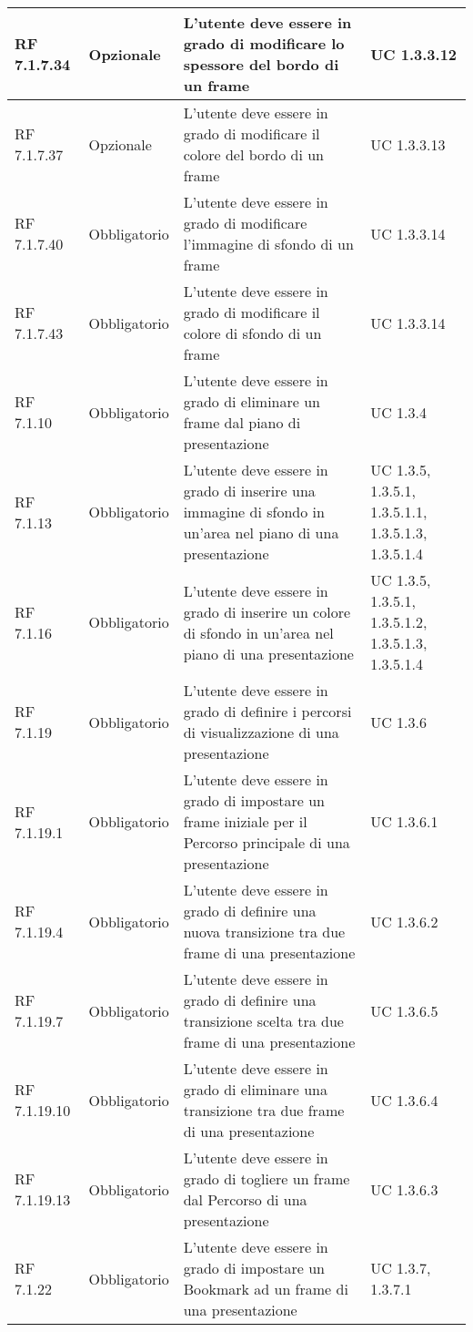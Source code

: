 {\begin{longtable} [c]{| p{2.5cm} | p{2.5cm} | p{6cm} |p{2.5cm}|}
		\hline
		RF 7.1.7.34 & Opzionale & L'utente deve essere in grado di modificare lo spessore del bordo di un frame\ped{g} & UC 1.3.3.12\\
		\hline
		RF 7.1.7.37 & Opzionale & L'utente deve essere in grado di modificare il colore del bordo di un frame\ped{g} & UC 1.3.3.13\\
		\hline
		RF 7.1.7.40 & Obbligatorio & L'utente deve essere in grado di modificare l'immagine di sfondo di un frame\ped{g} & UC 1.3.3.14\\
		\hline
		RF 7.1.7.43 & Obbligatorio & L'utente deve essere in grado di modificare il colore di sfondo di un frame\ped{g} & UC 1.3.3.14\\
		\hline
		RF 7.1.10 & Obbligatorio & L'utente deve essere in grado di eliminare un frame\ped{g} dal piano di presentazione & UC 1.3.4\\
		\hline
		RF 7.1.13 & Obbligatorio & L'utente deve essere in grado di inserire una immagine di sfondo in un’area nel piano di una presentazione & UC 1.3.5, 1.3.5.1, 1.3.5.1.1, 1.3.5.1.3, 1.3.5.1.4\\
		\hline
		RF 7.1.16 & Obbligatorio & L'utente deve essere in grado di inserire un colore di sfondo in un’area nel piano di una presentazione & UC 1.3.5, 1.3.5.1, 1.3.5.1.2, 1.3.5.1.3, 1.3.5.1.4\\
		\hline
		RF 7.1.19 & Obbligatorio & L'utente deve essere in grado di definire i percorsi\ped{g} di visualizzazione di una presentazione & UC 1.3.6\\
		\hline
		RF 7.1.19.1 & Obbligatorio & L'utente deve essere in grado di impostare un frame\ped{g} iniziale per il Percorso\ped{g} principale di una presentazione & UC 1.3.6.1\\
		\hline
		RF 7.1.19.4 & Obbligatorio & L’utente deve essere in grado di definire una nuova transizione tra due frame\ped{g} di una presentazione & UC 1.3.6.2\\
		\hline
		RF 7.1.19.7 & Obbligatorio & L'utente deve essere in grado di definire una transizione scelta tra due frame\ped{g} di una presentazione & UC 1.3.6.5\\
		\hline
		RF 7.1.19.10 & Obbligatorio & L'utente deve essere in grado di eliminare una transizione tra due frame\ped{g} di una presentazione & UC 1.3.6.4\\
		\hline
		RF 7.1.19.13 & Obbligatorio & L'utente deve essere in grado di togliere un frame\ped{g} dal Percorso\ped{g} di una presentazione & UC 1.3.6.3\\
		\hline
		RF 7.1.22 & Obbligatorio & L'utente deve essere in grado di impostare un Bookmark\ped{g} ad un frame\ped{g} di una presentazione & UC 1.3.7, 1.3.7.1\\

\end{longtable}}
